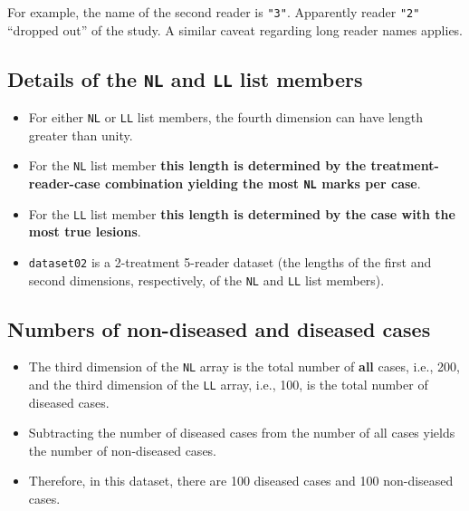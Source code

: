 \documentclass[]{book}
\newenvironment{Shaded}{\begin{snugshade}}{\end{snugshade}}
\newcommand{\CommentTok}[1]{\textcolor[rgb]{0.56,0.35,0.01}{\textit{#1}}}
\newcommand{\DecValTok}[1]{\textcolor[rgb]{0.00,0.00,0.81}{#1}}
\newcommand{\KeywordTok}[1]{\textcolor[rgb]{0.13,0.29,0.53}{\textbf{#1}}}
\newcommand{\NormalTok}[1]{#1}
\newcommand{\OperatorTok}[1]{\textcolor[rgb]{0.81,0.36,0.00}{\textbf{#1}}}
\providecommand{\tightlist}{%
  \setlength{\itemsep}{0pt}\setlength{\parskip}{0pt}}
\begin{document}
For example, the name of the second reader is \texttt{"3"}. Apparently reader \texttt{"2"} ``dropped out'' of the study. A similar caveat regarding long reader names applies.

\hypertarget{details-of-the-nl-and-ll-list-members-1}{%
\subsection{\texorpdfstring{Details of the \texttt{NL} and \texttt{LL} list members}{Details of the NL and LL list members}}\label{details-of-the-nl-and-ll-list-members-1}}

\begin{itemize}
\tightlist
\item
  For either \texttt{NL} or \texttt{LL} list members, the fourth dimension can have length greater than unity.
\item
  For the \texttt{NL} list member \textbf{this length is determined by the treatment-reader-case combination yielding the most \texttt{NL} marks per case}.
\item
  For the \texttt{LL} list member \textbf{this length is determined by the case with the most true lesions}.
\item
  \texttt{dataset02} is a 2-treatment 5-reader dataset (the lengths of the first and second dimensions, respectively, of the \texttt{NL} and \texttt{LL} list members).
\end{itemize}

\hypertarget{numbers-of-non-diseased-and-diseased-cases-1}{%
\subsection{Numbers of non-diseased and diseased cases}\label{numbers-of-non-diseased-and-diseased-cases-1}}

\begin{Shaded}
\end{Shaded}

\begin{itemize}
\tightlist
\item
  The third dimension of the \texttt{NL} array is the total number of \textbf{all} cases, i.e., 200, and the third dimension of the \texttt{LL} array, i.e., 100, is the total number of diseased cases.
\item
  Subtracting the number of diseased cases from the number of all cases yields the number of non-diseased cases.
\item
  Therefore, in this dataset, there are 100 diseased cases and 100 non-diseased cases.
\end{itemize}
\end{document}
